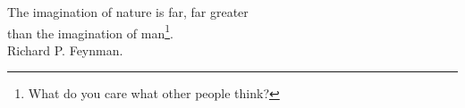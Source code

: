 \thispagestyle{empty}
\begin{flushright}

\vspace*{60mm}

The imagination of nature is far, far greater \\
than the imagination of man\footnote{What do you care what other people think?}.
\\
\vspace{4mm}
Richard P. Feynman.\textit{}\\

\end{flushright}